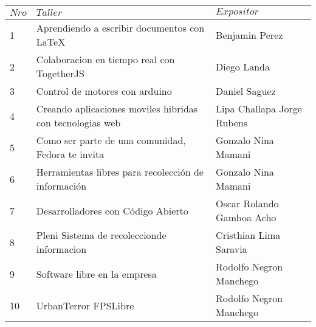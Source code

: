\documentclass[xcolor, x11names, letterpaper, 12pt]{letter}
\begin{document}
\centering
{}
\begin{tabular}{lll} \hline
\rowcolor{maroon!40} $Nro$ & $ Taller $ & $Expositor$\\\hline
1 & Aprendiendo a escribir documentos con LaTeX & Benjamin Perez\\
2 & Colaboracion en tiempo real con TogetherJS & Diego Landa\\
3 & Control de motores con arduino & Daniel Saguez\\
4 & Creando aplicaciones moviles hibridas con tecnologias web & Lipa Challapa Jorge Rubens\\
5 & Como ser parte de una comunidad, Fedora te invita & Gonzalo Nina Mamani\\
6 & Herramientas libres para recolección de información & Gonzalo Nina Mamani\\
7 & Desarrolladores con Código Abierto & Oscar Rolando Gamboa Acho\\
8 & Pleni Sistema de recoleccionde informacion & Cristhian Lima Saravia\\
9 & Software libre en la empresa & Rodolfo Negron Manchego \\
10 & UrbanTerror FPSLibre & Rodolfo Negron Manchego \\\hline
\end{tabular}
\end{document}
